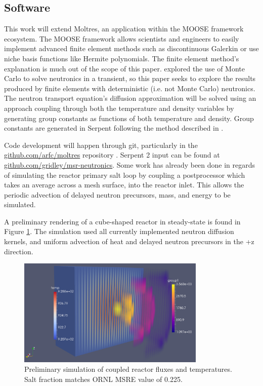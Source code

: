 \documentclass[12pt]{article}
\begin{document}
\subsection{Software}
This work will extend Moltres, an application within the MOOSE framework ecosystem. The MOOSE framework \cite{gaston_moose:_2009} allows scientists and engineers to easily implement advanced finite element methods such as discontinuous Galerkin or use niche basis functions like Hermite polynomials. The finite element method’s explanation is much out of the scope of this paper. \cite{aufiero_calculating_2014} explored the use of Monte Carlo to solve neutronics in a transient, so this paper seeks to explore the results produced by finite elements with deterministic (i.e. not Monte Carlo) neutronics. The neutron transport equation’s diffusion approximation will be solved using an approach coupling through both the temperature and density variables by generating group constants as functions of both temperature and density. Group constants are generated in Serpent following the method described in \cite{fridman_use_2011}.

	Code development will happen through git, particularly in the \url{github.com/arfc/moltres} repository \cite{moltres}. Serpent 2 input can be found at \url{github.com/gridley/msr-neutronics}. Some work has already been done in regards of simulating the reactor primary salt loop by coupling a postprocessor which takes an average across a mesh surface, into the reactor inlet. This allows the periodic advection of delayed neutron precursors, mass, and energy to be simulated.

A preliminary rendering of a cube-shaped reactor in steady-state is found in Figure \ref{fig:cubefig}. The simulation used all currently implemented neutron diffusion kernels, and uniform advection of heat and delayed neutron precursors in the +z direction.

\begin{figure}[ht]
\centering
\includegraphics[width=0.8\textwidth]{cuboidal.png}
\caption{Preliminary simulation of coupled reactor fluxes and temperatures. Salt fraction matches ORNL MSRE value of 0.225.}
\label{fig:cubefig}
\end{figure}
\end{document}
